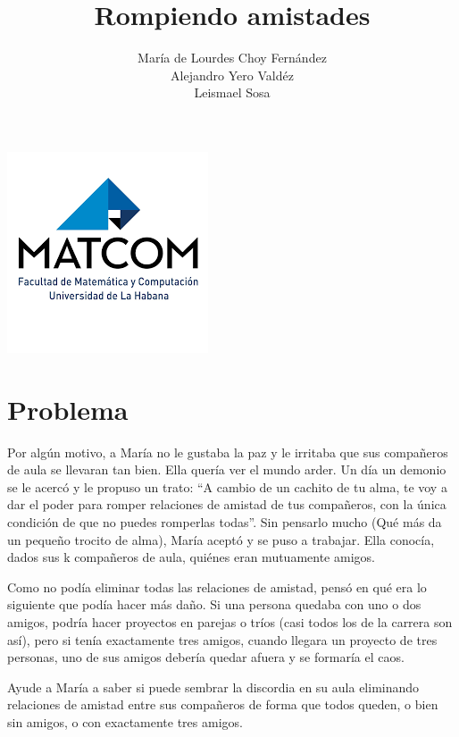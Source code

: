 \documentclass{article}
\title{\bf{Rompiendo amistades}}
\date{}
\author{María de Lourdes Choy Fernández \\ Alejandro Yero Valdéz \\ Leismael Sosa}
\begin{document}
\pagestyle{empty}
\maketitle
\thispagestyle{empty}
\begin{center}
\includegraphics[scale=1]{images}
\end{center}
\newpage

\tableofcontents

\newpage
\setcounter{page}{1}
\pagestyle{plain}

\section{Problema}
Por algún motivo, a María no le gustaba la paz y le irritaba que sus compañeros de aula se llevaran tan bien.
Ella quería ver el mundo arder. Un día un demonio se le acercó y le propuso un trato: \enquote{A cambio de un cachito de tu alma,
te voy a dar el poder para romper relaciones de amistad de tus compañeros, con la única condición de que no puedes romperlas todas}.
Sin pensarlo mucho (Qué más da un pequeño trocito de alma), María aceptó y se puso a trabajar. Ella conocía,
dados sus k compañeros de aula, quiénes eran mutuamente amigos.

Como no podía eliminar todas las relaciones de amistad, pensó en qué era lo siguiente que podía hacer más daño.
Si una persona quedaba con uno o dos amigos, podría hacer proyectos en parejas o tríos (casi todos los de la
carrera son así), pero si tenía exactamente tres amigos, cuando llegara un proyecto de tres personas, uno de sus
amigos debería quedar afuera y se formaría el caos.

Ayude a María a saber si puede sembrar la discordia en su aula eliminando relaciones de amistad entre sus
compañeros de forma que todos queden, o bien sin amigos, o con exactamente tres amigos.
\end{document}
